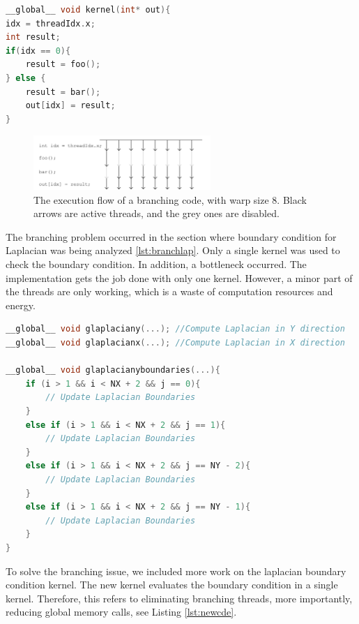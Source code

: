 \begin{lstlisting}[language=C++, label={lst:branch}, caption={Branching threads}]
__global__ void kernel(int* out){
idx = threadIdx.x;
int result;
if(idx == 0){
	result = foo();
} else {
	result = bar();
	out[idx] = result;
}
\end{lstlisting}

\begin{figure}[htbp]
	\centering
		\includegraphics[width=0.6\textwidth]{Figures/threads.png}
		\smallskip
	\caption[he execution flow]{The execution flow of a branching code, with warp size 8. Black arrows are active threads, and the grey ones are disabled.}
	\label{fig:threads}
\end{figure}

The branching problem occurred in the section where boundary condition for Laplacian was being analyzed \ref{lst:branchlap}. Only a single kernel was used to check the boundary condition. In addition, a bottleneck occurred. The implementation gets the job done with only one kernel. However, a minor part of the threads are only working, which is a waste of computation resources and energy.

\begin{lstlisting}[language=C++, label={lst:branchlap}, caption={Branching problem in the Laplacian boundary condition evaluation}]
__global__ void glaplaciany(...); //Compute Laplacian in Y direction
__global__ void glaplacianx(...); //Compute Laplacian in X direction

__global__ void glaplacianyboundaries(...){
    if (i > 1 && i < NX + 2 && j == 0){
     	// Update Laplacian Boundaries
    }
    else if (i > 1 && i < NX + 2 && j == 1){
  		// Update Laplacian Boundaries
  	}
    else if (i > 1 && i < NX + 2 && j == NY - 2){
        // Update Laplacian Boundaries
    }
    else if (i > 1 && i < NX + 2 && j == NY - 1){
        // Update Laplacian Boundaries
    }
}
\end{lstlisting}

To solve the branching issue, we included more work on the laplacian boundary condition kernel. The new kernel evaluates the boundary condition in a single kernel. Therefore, this refers to eliminating branching threads, more importantly, reducing global memory calls, see Listing \ref{lst:newcde}.

